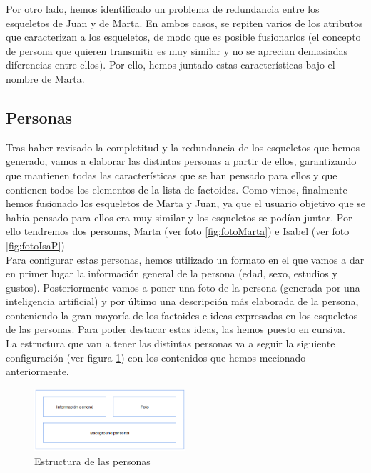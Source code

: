 Por otro lado, hemos identificado un problema de redundancia entre los esqueletos de Juan y de Marta. En ambos casos, se repiten varios de los atributos
que caracterizan a los esqueletos, de modo que es posible fusionarlos (el concepto de persona que quieren transmitir es muy similar y no se aprecian 
demasiadas diferencias entre ellos). Por ello, hemos juntado estas características bajo el nombre de Marta.

\subsection{Personas}
Tras haber revisado la completitud y la redundancia de los esqueletos que hemos generado, vamos a elaborar las distintas personas a partir de ellos, 
garantizando que mantienen todas las características que se han pensado para ellos y que contienen todos los elementos de la lista de factoides. Como 
vimos, finalmente hemos fusionado los esqueletos de Marta y Juan, ya que el usuario objetivo que se había pensado para ellos era muy similar y los esqueletos 
se podían juntar. Por ello tendremos dos personas, Marta (ver foto \ref{fig:fotoMarta}) e Isabel (ver foto \ref{fig:fotoIsaP}) \\

Para configurar estas personas, hemos utilizado un formato en el que vamos a dar en primer lugar la información general de la persona 
(edad, sexo, estudios y gustos). Posteriormente vamos a poner una foto de la persona (generada por una inteligencia artificial) y por último 
una descripción más elaborada de la persona, conteniendo la gran mayoría de los factoides e ideas expresadas en los esqueletos de las personas. 
Para poder destacar estas ideas, las hemos puesto en cursiva. \\

La estructura que van a tener las distintas personas va a seguir la siguiente configuración (ver figura \ref{fig:estructura-personas}) con los contenidos que hemos mecionado anteriormente.
\begin{figure}[h]
    \centering
    \includegraphics[width=0.5\textwidth]{Imagenes/Personas/Plantilla personas.png}
    \caption{Estructura de las personas}
    \label{fig:estructura-personas}
\end{figure}

